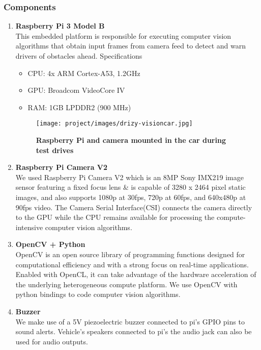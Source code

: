 \subsubsection{Components}
\begin{enumerate}
   \item \textbf{Raspberry Pi 3 Model B} \\ This embedded platform is responsible for executing computer vision algorithms that obtain input frames from camera feed to detect and warn drivers of obstacles ahead. Specifications
   \begin{itemize}
    \item CPU: 4x ARM Cortex-A53, 1.2GHz
    \item GPU: Broadcom VideoCore IV
    \item RAM: 1GB LPDDR2 (900 MHz)
    \end{itemize}
    
    \begin{figure}[hbtp]
    \centering
    {
    \texttt{[image: project/images/drizy-visioncar.jpg]}
    \caption{\textbf{Raspberry Pi and camera mounted in the car during test drives}}
    }
    \end{figure}
   
   \item \textbf{Raspberry Pi Camera V2} \\ We used Raspberry Pi Camera V2 which is an 8MP Sony IMX219 image sensor featuring a fixed focus lens & is capable of 3280 x 2464 pixel static images, and also supports 1080p at 30fps, 720p at 60fps, and 640x480p at 90fps video. The Camera Serial Interface(CSI) connects the camera directly to the GPU while the CPU remains available for processing the compute-intensive computer vision algorithms. 
   
   \item \textbf{OpenCV + Python} \\ OpenCV is an open source library of programming functions designed for computational efficiency and with a strong focus on real-time applications. Enabled with OpenCL, it can take advantage of the hardware acceleration of the underlying heterogeneous compute platform. We use OpenCV with python bindings to code computer vision algorithms.
    
   \item \textbf{Buzzer} \\ We make use of a 5V piezoelectric buzzer connected to pi's GPIO pins to sound alerts. Vehicle's speakers connected to pi's the audio jack can also be used for audio outputs.
\end{enumerate}

